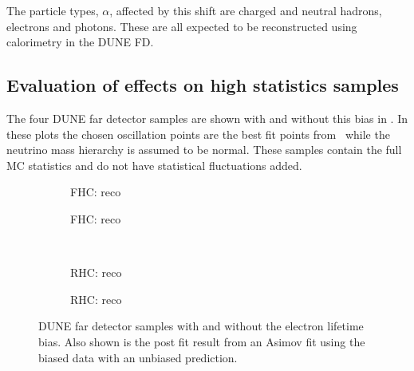 The particle types, $\alpha$, affected by this shift are charged and neutral hadrons, electrons and photons.
These are all expected to be reconstructed using calorimetry in the DUNE FD.

\subsection{Evaluation of effects on high statistics samples}
\label{sec:pdune_calibration:osc:highStats}

The four DUNE far detector samples are shown with and without this bias in .
In these plots the chosen oscillation points are the best fit points from~\cite{nufit4} while the neutrino mass hierarchy is assumed to be normal.
These samples contain the full MC statistics and do not have statistical fluctuations added.

\begin{figure}[h]
	\begin{subfigure}[t]{.5\textwidth}
		\begin{adjustbox}{max totalsize=\textwidth, center}
			
		\end{adjustbox}
		\caption{FHC: reco \numu}
	\end{subfigure}	
	\hfill
	\begin{subfigure}[t]{.5\textwidth}
		\begin{adjustbox}{max totalsize=\textwidth, center}
			
		\end{adjustbox}
		\caption{FHC: reco \nue}
	\end{subfigure}
	\\
	\begin{subfigure}[t]{.5\textwidth}
		\begin{adjustbox}{max totalsize=\textwidth, center}
			
		\end{adjustbox}
		\caption{RHC: reco \anumu}
	\end{subfigure}	
	\hfill
	\begin{subfigure}[t]{.5\textwidth}
		\begin{adjustbox}{max totalsize=\textwidth, center}
			
		\end{adjustbox}
		\caption{RHC: reco \anue}
	\end{subfigure}	
	\caption[DUNE far detector samples with and without electron lifetime bias]{DUNE far detector samples with and without the electron lifetime bias. Also shown is the post fit result from an Asimov fit using the biased data with an unbiased prediction.}
	\label{fig:fdSamplesLifetime}
\end{figure}

